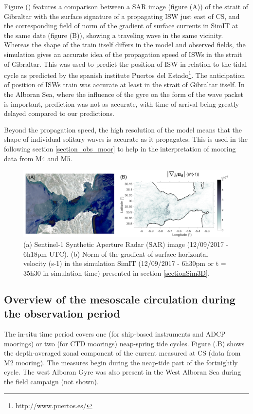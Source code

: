 Figure () features a comparison between a SAR image (figure (A)) of the strait of Gibraltar with the surface signature of a propagating ISW just east of CS, and the corresponding field of norm of the gradient of surface currents in SimIT at the same date (figure (B)), showing a traveling wave in the same vicinity. Whereas the shape of the train itself differs in the model and observed fields, the simulation gives an accurate idea of the propagation speed of ISWs in the strait of Gibraltar. This was used to predict the position of ISW in relation to the tidal cycle as predicted by the spanish institute Puertos del Estado\footnote{http://www.puertos.es/}. The anticipation of position of ISWs train was accurate at least in the strait of Gibraltar itself. In the Alboran Sea, where the influence of the gyre on the form of the wave packet is important, prediction was not as accurate, with time of arrival being greatly delayed compared to our predictions. 

Beyond the propagation speed, the high resolution of the model means that the shape of individual solitary waves is accurate as it propagates. This is used in the following section \ref{section_obs_moor} to help in the interpretation of mooring data from M4 and M5.


\begin{figure}[!h]
 \includegraphics[width=\textwidth]{./GBR3D/Comp_SAR_IES.png}
 \caption {(a) Sentinel-1 Synthetic Aperture Radar (SAR) image (12/09/2017 - 6h18pm UTC). (b) Norm of the gradient of surface horizontal velocity (s-1) in the simulation SimIT (12/09/2017 - 6h30pm or t = 35h30 in simulation time) presented in section \ref{sectionSim3D}.}
 \label{fig_SARIES}
\end{figure}


\subsection{Overview of the mesoscale circulation during the observation period}

The in-situ time period covers one (for ship-based instruments and ADCP moorings) or two (for CTD moorings) neap-spring tide cycles. Figure (.B) shows the depth-averaged zonal component of the current measured at CS (data from M2 mooring). The measures begin during the neap-tide part of the fortnightly cycle. The west Alboran Gyre was also present in the West Alboran Sea during the field campaign (not shown). 

